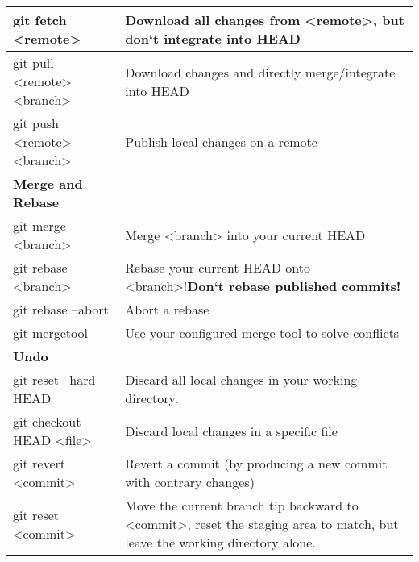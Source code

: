 \begin{longtable}{| p{} | p{} |}
    git fetch <remote>&  
    Download all changes from <remote>,
    but don‘t integrate into HEAD
    \\ \hline
    
    git pull <remote> <branch>&
    Download changes and directly merge/integrate into HEAD  
    \\ \hline 
    
    git push <remote> <branch>&
    Publish local changes on a remote
    \\ \hline \hline
       
   \textbf{ Merge and Rebase}&
    \\\hline 
    
    \hline
    git merge <branch>&
    Merge <branch> into your current HEAD
    \\ \hline 
    
    git rebase <branch>& 
    Rebase your current HEAD onto <branch>!\textbf{Don‘t rebase published commits!}
    \\ \hline 
    
    git rebase --abort&
    Abort a rebase
    \\ \hline 
    
    git mergetool& 
    Use your configured merge tool to solve conflicts
    \\ \hline \hline
   
    \textbf{Undo}&
    \\\hline 

    \hline
    git reset --hard HEAD&
    Discard all local changes in your working directory.
    \\ \hline  
    
    git checkout HEAD <file>&
    Discard local changes in a specific file
    \\ \hline   
    
    git revert <commit>&
    Revert a commit (by producing a new commit with contrary changes)
    \\ \hline    
    
    git reset <commit>&
    Move the current branch tip backward to <commit>, reset the staging area to match, but leave the working directory alone. 
    \\ \hline
\end{longtable}
